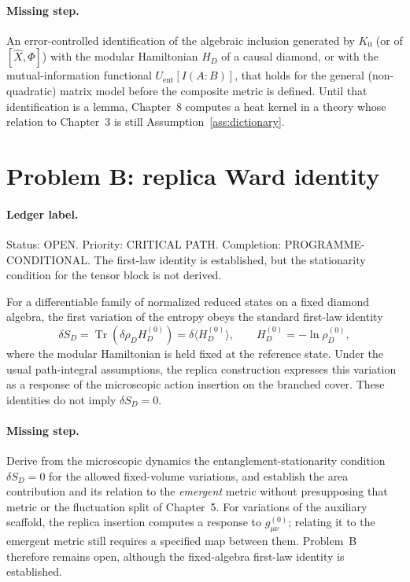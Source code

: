 \paragraph{Missing step.}
An error-controlled identification of the algebraic inclusion generated
by \(K_0\) (or of \([\hat X,\Phi]\)) with the modular Hamiltonian \(H_D\)
of a causal diamond, or with the mutual-information functional
\(U_{\mathrm{ent}}[I(A:B)]\), that holds for the general (non-quadratic)
matrix model before the composite metric is defined. Until that
identification is a lemma, Chapter~8 computes a heat kernel in a theory
whose relation to Chapter~3 is still Assumption~\ref{ass:dictionary}.

\section{Problem B: replica Ward identity}
\label{sec:status-B}

\paragraph{Ledger label.}
Status: OPEN. Priority: CRITICAL PATH. Completion:
PROGRAMME-CONDITIONAL. The first-law identity is established, but
the stationarity condition for the tensor block is not derived.

For a differentiable family of normalized reduced states on a fixed
diamond algebra, the first variation of the entropy obeys the standard
first-law identity
\[
\delta S_D
=
\operatorname{Tr}(\delta\rho_D H_D^{(0)})
=
\delta\langle H_D^{(0)}\rangle,
\qquad
H_D^{(0)}=-\ln\rho_D^{(0)},
\]
where the modular Hamiltonian is held fixed at the reference state.
Under the usual path-integral assumptions, the replica construction
expresses this variation as a response of the microscopic action
insertion on the branched cover. These identities do not imply
\(\delta S_D=0\).

\paragraph{Missing step.}
Derive from the microscopic dynamics the entanglement-stationarity
condition \(\delta S_D=0\) for the allowed fixed-volume variations,
and establish the area contribution and its relation to the
\emph{emergent} metric without presupposing that metric or the
fluctuation split of Chapter~5. For variations of the auxiliary
scaffold, the replica insertion computes a response to
\(g^{(0)}_{\mu\nu}\); relating it to the emergent metric still
requires a specified map between them. Problem~B therefore remains
open, although the fixed-algebra first-law identity is established.

